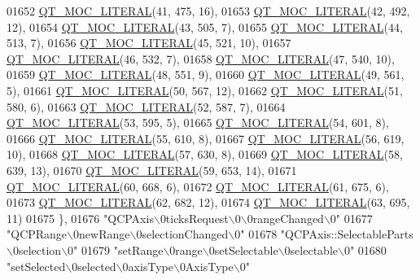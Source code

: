 \begin{DoxyCode}
01652 \hyperlink{a00067_a75bb9482d242cde0a06c9dbdc6b83abe}{QT\_MOC\_LITERAL}(41, 475, 16),
01653 \hyperlink{a00067_a75bb9482d242cde0a06c9dbdc6b83abe}{QT\_MOC\_LITERAL}(42, 492, 12),
01654 \hyperlink{a00067_a75bb9482d242cde0a06c9dbdc6b83abe}{QT\_MOC\_LITERAL}(43, 505, 7),
01655 \hyperlink{a00067_a75bb9482d242cde0a06c9dbdc6b83abe}{QT\_MOC\_LITERAL}(44, 513, 7),
01656 \hyperlink{a00067_a75bb9482d242cde0a06c9dbdc6b83abe}{QT\_MOC\_LITERAL}(45, 521, 10),
01657 \hyperlink{a00067_a75bb9482d242cde0a06c9dbdc6b83abe}{QT\_MOC\_LITERAL}(46, 532, 7),
01658 \hyperlink{a00067_a75bb9482d242cde0a06c9dbdc6b83abe}{QT\_MOC\_LITERAL}(47, 540, 10),
01659 \hyperlink{a00067_a75bb9482d242cde0a06c9dbdc6b83abe}{QT\_MOC\_LITERAL}(48, 551, 9),
01660 \hyperlink{a00067_a75bb9482d242cde0a06c9dbdc6b83abe}{QT\_MOC\_LITERAL}(49, 561, 5),
01661 \hyperlink{a00067_a75bb9482d242cde0a06c9dbdc6b83abe}{QT\_MOC\_LITERAL}(50, 567, 12),
01662 \hyperlink{a00067_a75bb9482d242cde0a06c9dbdc6b83abe}{QT\_MOC\_LITERAL}(51, 580, 6),
01663 \hyperlink{a00067_a75bb9482d242cde0a06c9dbdc6b83abe}{QT\_MOC\_LITERAL}(52, 587, 7),
01664 \hyperlink{a00067_a75bb9482d242cde0a06c9dbdc6b83abe}{QT\_MOC\_LITERAL}(53, 595, 5),
01665 \hyperlink{a00067_a75bb9482d242cde0a06c9dbdc6b83abe}{QT\_MOC\_LITERAL}(54, 601, 8),
01666 \hyperlink{a00067_a75bb9482d242cde0a06c9dbdc6b83abe}{QT\_MOC\_LITERAL}(55, 610, 8),
01667 \hyperlink{a00067_a75bb9482d242cde0a06c9dbdc6b83abe}{QT\_MOC\_LITERAL}(56, 619, 10),
01668 \hyperlink{a00067_a75bb9482d242cde0a06c9dbdc6b83abe}{QT\_MOC\_LITERAL}(57, 630, 8),
01669 \hyperlink{a00067_a75bb9482d242cde0a06c9dbdc6b83abe}{QT\_MOC\_LITERAL}(58, 639, 13),
01670 \hyperlink{a00067_a75bb9482d242cde0a06c9dbdc6b83abe}{QT\_MOC\_LITERAL}(59, 653, 14),
01671 \hyperlink{a00067_a75bb9482d242cde0a06c9dbdc6b83abe}{QT\_MOC\_LITERAL}(60, 668, 6),
01672 \hyperlink{a00067_a75bb9482d242cde0a06c9dbdc6b83abe}{QT\_MOC\_LITERAL}(61, 675, 6),
01673 \hyperlink{a00067_a75bb9482d242cde0a06c9dbdc6b83abe}{QT\_MOC\_LITERAL}(62, 682, 12),
01674 \hyperlink{a00067_a75bb9482d242cde0a06c9dbdc6b83abe}{QT\_MOC\_LITERAL}(63, 695, 11)
01675     \},
01676     \textcolor{stringliteral}{"QCPAxis\(\backslash\)0ticksRequest\(\backslash\)0\(\backslash\)0rangeChanged\(\backslash\)0"}
01677     \textcolor{stringliteral}{"QCPRange\(\backslash\)0newRange\(\backslash\)0selectionChanged\(\backslash\)0"}
01678     \textcolor{stringliteral}{"QCPAxis::SelectableParts\(\backslash\)0selection\(\backslash\)0"}
01679     \textcolor{stringliteral}{"setRange\(\backslash\)0range\(\backslash\)0setSelectable\(\backslash\)0selectable\(\backslash\)0"}
01680     \textcolor{stringliteral}{"setSelected\(\backslash\)0selected\(\backslash\)0axisType\(\backslash\)0AxisType\(\backslash\)0"}

\end{DoxyCode}
